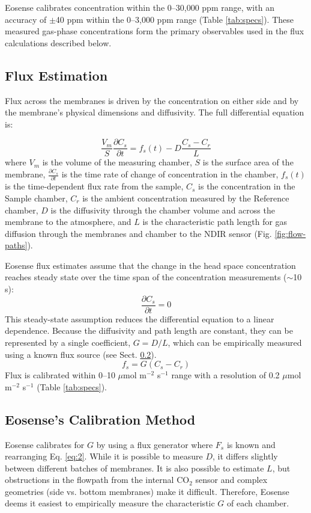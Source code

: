 \documentclass[11pt]{article}
\begin{document}
Eosense calibrates concentration within the 0--30,000 ppm range, with an accuracy of $\pm$40 ppm within the 0--3,000 ppm range (Table \ref{tab:specs}). These measured gas-phase concentrations form the primary observables used in the flux calculations described below.


\subsection{Flux Estimation}
Flux across the membranes is driven by the concentration on either side and by the membrane's physical dimensions and diffusivity. The full differential equation is:

\begin{equation} \label{eq:1}
	\frac{V_m}{S} \frac{\partial C_s}{\partial t} = f_s(t) - D \frac{C_s - C_r}{L}
\end{equation}
where $V_m$ is the volume of the measuring chamber, $S$ is the surface area of the membrane, $\frac{\partial C_s}{\partial t}$ is the time rate of change of concentration in the chamber, $f_s(t)$ is the time-dependent flux rate from the sample, $C_s$ is the concentration in the Sample chamber, $C_r$ is the ambient concentration measured by the Reference chamber, $D$ is the diffusivity through the chamber volume and across the membrane to the atmosphere, and $L$ is the characteristic path length for gas diffusion through the membranes and chamber to the NDIR sensor (Fig. \ref{fig:flow-paths}).

Eosense flux estimates assume that the change in the head space concentration reaches steady state over the time span of the concentration measurements ($\sim$10 s):
\begin{equation*}
	\frac{\partial C_s}{\partial t} = 0
\end{equation*}
This steady-state assumption reduces the differential equation to a linear dependence. Because the diffusivity and path length are constant, they can be represented by a single coefficient, $G = D/L$, which can be empirically measured using a known flux source (see Sect. \ref{sub:eos-cal}).
\begin{equation} \label{eq:2}
	f_s = G(C_s - C_r)
\end{equation}
Flux is calibrated within 0--10 $\mu$mol m$^{-2}$ s$^{-1}$ range with a resolution of 0.2 $\mu$mol m$^{-2}$ s$^{-1}$ (Table \ref{tab:specs}).

\subsection{Eosense's Calibration Method} 
\label{sub:eos-cal}
Eosense calibrates for $G$ by using a flux generator where $F_s$ is known and rearranging Eq. \ref{eq:2}. While it is possible to measure $D$, it differs slightly between different batches of membranes. It is also possible to estimate $L$, but obstructions in the flowpath from the internal CO$_2$ sensor and complex geometries (side vs. bottom membranes) make it difficult. Therefore, Eosense deems it easiest to empirically measure the characteristic $G$ of each chamber. 
\end{document}
